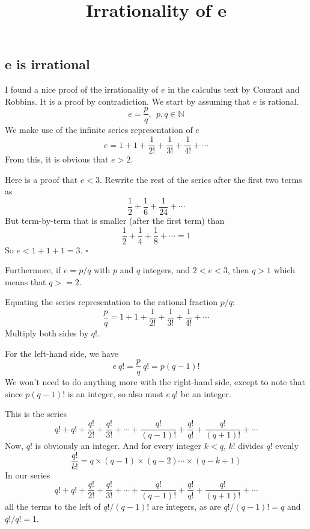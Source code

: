 \documentclass[11pt, oneside]{article}
\title{Irrationality of e}
\date{}
\begin{document}
\maketitle
\Large


\subsection*{e is irrational}

I found a nice proof of the irrationality of $e$ in the calculus text by Courant and Robbins.  It is a proof by contradiction.  We start by assuming that $e$ is rational.
\[ e = \frac{p}{q}, \ \  p,q \in \mathbb{N} \]
We make use of the infinite series representation of $e$
\[ e = 1 + 1 + \frac{1}{2!}  + \frac{1}{3!} + \frac{1}{4!} + \cdots \]
From this, it is obvious that $e > 2$.

Here is a proof that $e < 3$.  Rewrite the rest of the series after the first two terms as
\[  \frac{1}{2}  + \frac{1}{6} + \frac{1}{24} + \cdots \]
But term-by-term that is smaller (after the first term) than
\[ \frac{1}{2}  + \frac{1}{4} + \frac{1}{8} + \cdots = 1 \]
So $e < 1 + 1 + 1 = 3$.  $\square$
 
Furthermore, if $e=p/q$ with $p$ and $q$ integers, and $2 < e < 3$, then $q>1$ which means that $q>=2$.

Equating the series representation to the rational fraction $p/q$:
\[ \frac{p}{q} = 1 + 1 + \frac{1}{2!}  + \frac{1}{3!} + \frac{1}{4!} + \cdots \]
Multiply both sides by $q!$.  

For the left-hand side, we have 
\[ e \ q! = \frac{p}{q} \ q! = p (q-1)! \]
We won't need to do anything more with the right-hand side, except to note that since $p (q-1)!$ is an integer, so also must $e\ q!$ be an integer.  

This is the series
\[ q! + q! + \frac{q!}{2!}  + \frac{q!}{3!}  + \cdots + \frac{q!}{(q-1)!} + \frac{q!}{q!} + \frac{q!}{(q+1)!} + \cdots \]
Now, 
$q!$ is obviously an integer. And for every integer $k < q$, $k!$ divides $q!$ evenly 
\[ \frac{q!}{k!} = q \times (q-1) \times (q-2) \cdots \times (q-k+1) \]
In our series
\[ q! + q! + \frac{q!}{2!}  + \frac{q!}{3!}  + \cdots + \frac{q!}{(q-1)!} + \frac{q!}{q!} + \frac{q!}{(q+1)!} + \cdots \]
all the terms to the left of $q!/(q-1)!$ are integers, as are $q!/(q-1)! = q$ and $q!/q! = 1$.  
\vspace{2 mm}
\end{document}
